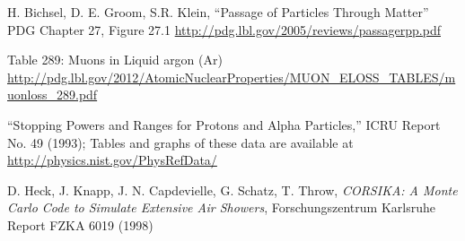 \documentclass[a4paper,11pt]{article}
\begin{document}
\begin{thebibliography}{99}
  H. Bichsel, D. E. Groom, S.R. Klein, ``Passage of Particles Through Matter'' PDG Chapter 27, Figure 27.1 \url{http://pdg.lbl.gov/2005/reviews/passagerpp.pdf}

   Table 289: Muons in Liquid argon (Ar) \url{http://pdg.lbl.gov/2012/AtomicNuclearProperties/MUON_ELOSS_TABLES/muonloss_289.pdf}

   ``Stopping Powers and Ranges for Protons and Alpha Particles,'' ICRU Report No. 49 (1993); Tables and graphs of these data are available at \url{http://physics.nist.gov/PhysRefData/}

   D. Heck, J. Knapp, J. N. Capdevielle, G. Schatz, T. Throw, \emph{CORSIKA: A Monte Carlo Code to Simulate Extensive Air Showers}, Forschungszentrum Karlsruhe Report FZKA 6019 (1998)









\end{thebibliography}
\end{document}
